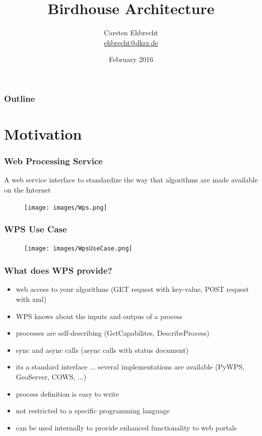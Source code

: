 \documentclass{beamer}
\title{Birdhouse Architecture}
\author{
Carsten Ehbrecht\\
\medskip
{\scriptsize \url{ehbrecht@dkrz.de}}
}
\institute{German Climate Computing Center (DKRZ)}
\date{February 2016}
\begin{document}

  \begin{frame}[plain]
    \titlepage
  \end{frame}


  {
    \begin{frame} %
      \frametitle{Outline}
      \tableofcontents[subsectionstyle=hide/hide]
    \end{frame}
  }


  \section{Motivation}

  \begin{frame}
    \frametitle{Web Processing Service}
    A web service interface to standardize the way that algorithms are made available on the Internet
    \begin{figure}
      \texttt{[image: images/Wps.png]}
    \end{figure}
  \end{frame}


  \begin{frame}
    \frametitle{WPS Use Case}
    \begin{figure}
      \texttt{[image: images/WpsUseCase.png]}
    \end{figure}
  \end{frame}



  \begin{frame}
    \frametitle{What does WPS provide?}
    \begin{itemize}
      \item web access to your algorithms (GET request with key-value, POST request with xml)
      \item WPS knows about the inputs and outpus of a process
      \item processes are self-describing (GetCapabilites, DescribeProcess)
      \item sync and async calls (async calls with status document)
      \item its a standard interface ... several implementations are available (PyWPS, GeoServer, COWS, ...)
      \item process definition is easy to write
      \item not restricted to a specific programming language
      \item can be used internally to provide enhanced functionality to web portals
    \end{itemize}
  \end{frame}
\end{document}
